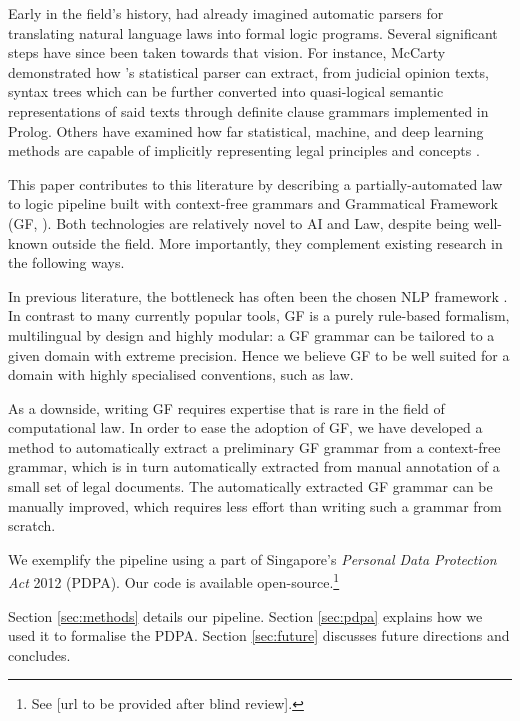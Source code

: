 \documentclass{IOS-Book-Article}
\begin{document}
Early in the field's history, \cite{bing_designing_1987} had already imagined automatic parsers for translating natural language laws into formal logic programs. Several significant steps have since been taken towards that vision. For instance, McCarty \cite{mccarty_deep_2007} demonstrated how \cite{collins_head-driven_2003}'s statistical parser can extract, from judicial opinion texts, syntax trees which can be further converted into quasi-logical semantic representations of said texts through definite clause grammars implemented in Prolog. Others have examined how far statistical, machine, and deep learning methods are capable of implicitly representing legal principles and concepts \cite{groendijk_neural_1992, de_maat_automatic_2008, winkels_automatic_2012, chalkidis_neural_2019, chalkidis_lexglue_2022}.

This paper contributes to this literature by describing a partially-automated law to logic pipeline built with
context-free grammars \cite{chomsky-1956} and Grammatical Framework (GF, \cite{ranta-2011}).
Both technologies are relatively novel to AI and Law, despite being well-known outside the field.
More importantly, they complement existing research in the following ways.

In previous literature, the bottleneck has often been the chosen NLP framework \cite{quaresma_question_2005,wyner_study_2013}.
In contrast to many currently popular tools, GF is a purely rule-based formalism, multilingual by design and
highly modular: a GF grammar can be tailored to a given domain with extreme precision.
Hence we believe GF to be well suited for a domain with highly specialised conventions, such as law.

As a downside, writing GF requires expertise that is rare in the field of computational law.
In order to ease the adoption of GF, we have developed a method to automatically extract a preliminary GF grammar from a context-free grammar,
which is in turn automatically extracted from manual annotation of a small set of legal documents.
The automatically extracted GF grammar can be manually improved, which requires less effort than writing such a grammar from scratch.

We exemplify the pipeline using a part of Singapore's \textit{Personal Data Protection Act} 2012 (PDPA). Our code is available open-source.\footnote{See [url to be provided after blind review].}

Section \ref{sec:methods} details our pipeline. Section \ref{sec:pdpa} explains how we used it to formalise the PDPA. Section \ref{sec:future} discusses future directions and concludes.
\end{document}
